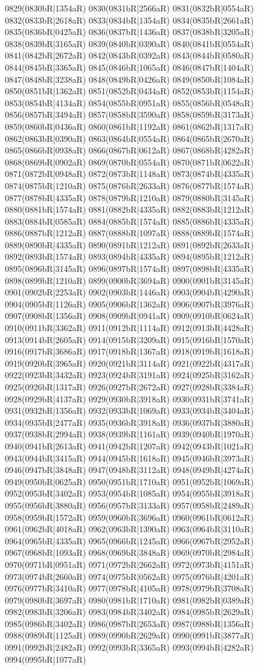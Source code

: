 0829(0830bR|1354aR) 0830(0831bR|2566aR) 0831(0832bR|0554aR) 0832(0833bR|2618aR) 0833(0834bR|1354aR) 0834(0835bR|2661aR) 0835(0836bR|0425aR) 0836(0837bR|1436aR) 0837(0838bR|3205aR) 0838(0839bR|3165aR) 0839(0840bR|0390aR) 0840(0841bR|0554aR) 0841(0842bR|2672aR) 0842(0843bR|0392aR) 0843(0844bR|0580aR) 0844(0845bR|3365aR) 0845(0846bR|1065aR) 0846(0847bR|1404aR) 0847(0848bR|3238aR) 0848(0849bR|0426aR) 0849(0850bR|1084aR) 0850(0851bR|1362aR) 0851(0852bR|0434aR) 0852(0853bR|1154aR) 0853(0854bR|4134aR) 0854(0855bR|0951aR) 0855(0856bR|0548aR) 0856(0857bR|3494aR) 0857(0858bR|3590aR) 0858(0859bR|3173aR) 0859(0860bR|0436aR) 0860(0861bR|1192aR) 0861(0862bR|1317aR) 0862(0863bR|0390aR) 0863(0864bR|0554aR) 0864(0865bR|2670aR) 0865(0866bR|0938aR) 0866(0867bR|0612aR) 0867(0868bR|4282aR) 0868(0869bR|0902aR) 0869(0870bR|0554aR) 0870(0871bR|0622aR) 0871(0872bR|0948aR) 0872(0873bR|1148aR) 0873(0874bR|4335aR) 0874(0875bR|1210aR) 0875(0876bR|2633aR) 0876(0877bR|1574aR) 0877(0878bR|4335aR) 0878(0879bR|1210aR) 0879(0880bR|3145aR) 0880(0881bR|1574aR) 0881(0882bR|4335aR) 0882(0883bR|1212aR) 0883(0884bR|0585aR) 0884(0885bR|1574aR) 0885(0886bR|4335aR) 0886(0887bR|1212aR) 0887(0888bR|1097aR) 0888(0889bR|1574aR) 0889(0890bR|4335aR) 0890(0891bR|1212aR) 0891(0892bR|2633aR) 0892(0893bR|1574aR) 0893(0894bR|4335aR) 0894(0895bR|1212aR) 0895(0896bR|3145aR) 0896(0897bR|1574aR) 0897(0898bR|4335aR) 0898(0899bR|1210aR) 0899(0900bR|3694aR) 0900(0901bR|3145aR) 0901(0902bR|2253aR) 0902(0903bR|1446aR) 0903(0904bR|4290aR) 0904(0905bR|1126aR) 0905(0906bR|1362aR) 0906(0907bR|3976aR) 0907(0908bR|1356aR) 0908(0909bR|0941aR) 0909(0910bR|0624aR) 0910(0911bR|3362aR) 0911(0912bR|1114aR) 0912(0913bR|4428aR) 0913(0914bR|2605aR) 0914(0915bR|3209aR) 0915(0916bR|1570aR) 0916(0917bR|3686aR) 0917(0918bR|1367aR) 0918(0919bR|1618aR) 0919(0920bR|3965aR) 0920(0921bR|3114aR) 0921(0922bR|4317aR) 0922(0923bR|3432aR) 0923(0924bR|3191aR) 0924(0925bR|3162aR) 0925(0926bR|1317aR) 0926(0927bR|2672aR) 0927(0928bR|3384aR) 0928(0929bR|4137aR) 0929(0930bR|3918aR) 0930(0931bR|3741aR) 0931(0932bR|1356aR) 0932(0933bR|1069aR) 0933(0934bR|3404aR) 0934(0935bR|2477aR) 0935(0936bR|3918aR) 0936(0937bR|3880aR) 0937(0938bR|2994aR) 0938(0939bR|1161aR) 0939(0940bR|1970aR) 0940(0941bR|2613aR) 0941(0942bR|1207aR) 0942(0943bR|1021aR) 0943(0944bR|3415aR) 0944(0945bR|1618aR) 0945(0946bR|3973aR) 0946(0947bR|3848aR) 0947(0948bR|3112aR) 0948(0949bR|4274aR) 0949(0950bR|0625aR) 0950(0951bR|1710aR) 0951(0952bR|1069aR) 0952(0953bR|3402aR) 0953(0954bR|1085aR) 0954(0955bR|3918aR) 0955(0956bR|3880aR) 0956(0957bR|3133aR) 0957(0958bR|2489aR) 0958(0959bR|1572aR) 0959(0960bR|3696aR) 0960(0961bR|0612aR) 0961(0962bR|4018aR) 0962(0963bR|1390aR) 0963(0964bR|3110aR) 0964(0965bR|4335aR) 0965(0966bR|1245aR) 0966(0967bR|2952aR) 0967(0968bR|1093aR) 0968(0969bR|3848aR) 0969(0970bR|2984aR) 0970(0971bR|0951aR) 0971(0972bR|2662aR) 0972(0973bR|4151aR) 0973(0974bR|2660aR) 0974(0975bR|0562aR) 0975(0976bR|4201aR) 0976(0977bR|3410aR) 0977(0978bR|4105aR) 0978(0979bR|3708aR) 0979(0980bR|3697aR) 0980(0981bR|1710aR) 0981(0982bR|0389aR) 0982(0983bR|3206aR) 0983(0984bR|3402aR) 0984(0985bR|2629aR) 0985(0986bR|3402aR) 0986(0987bR|2653aR) 0987(0988bR|1356aR) 0988(0989bR|1125aR) 0989(0990bR|2629aR) 0990(0991bR|3877aR) 0991(0992bR|2482aR) 0992(0993bR|3365aR) 0993(0994bR|4282aR) 0994(0995bR|1077aR) 